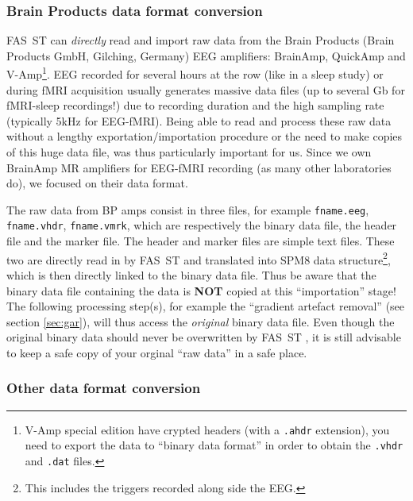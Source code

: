 \documentclass[a4paper,titlepage]{article}
\def\dblS{\hbox{S\hskip -4.5pt S}}
\newcommand{\fasst}{FA\dblS T } 	%
\begin{document}
\subsubsection{Brain Products data format conversion}
\label{sec:dataBP}

\fasst can {\it directly} read and import raw data from the Brain Products (Brain Products GmbH, Gilching, Germany) EEG amplifiers: BrainAmp, QuickAmp and V-Amp\footnote{V-Amp special edition have crypted headers (with a {\tt .ahdr} extension), you need to export the data to ``binary data format'' in order to obtain the {\tt *.vhdr} and {\tt *.dat} files.}. EEG recorded for several hours at the row (like in a sleep study) or during fMRI acquisition usually generates massive data files (up to several Gb for fMRI-sleep recordings!) due to recording duration and the high sampling rate (typically 5kHz for EEG-fMRI). Being able to read and process these raw data without a lengthy exportation/importation procedure or the need to make copies of this huge data file, was thus particularly important for us. Since we own BrainAmp MR amplifiers for EEG-fMRI recording (as many other laboratories do), we focused on their data format.

The raw data from BP amps consist in three files, for example {\tt fname.eeg}, {\tt fname.vhdr}, {\tt fname.vmrk}, which are respectively the binary data file, the header file and the marker file.
The header and marker files are simple text files. These two are directly read in by \fasst and translated into SPM8 data structure\footnote{This includes the triggers recorded along side the EEG.}, which is then directly linked to the binary data file. Thus be aware that the binary data file containing the data is {\bf NOT} copied at this ``importation'' stage! The following processing step(s), for example the ``gradient artefact removal'' (see section \ref{sec:gar}), will thus access the {\it original} binary data file. Even though the original binary data should never be overwritten by \fasst\hspace{-4pt}, it is still advisable to keep a safe copy of your orginal ``raw data'' in a safe place.

\subsubsection{Other data format conversion}
\label{sec:dataother}
\end{document}
